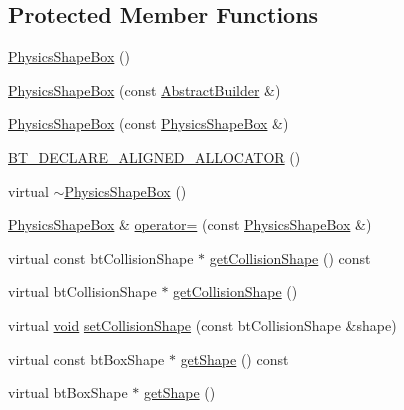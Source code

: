 \subsection*{Protected Member Functions}
\begin{DoxyCompactItemize}
\item 
\mbox{\hyperlink{classnjli_1_1_physics_shape_box_a42baebdb0053634644acf4df9ca2562c}{Physics\+Shape\+Box}} ()
\item 
\mbox{\hyperlink{classnjli_1_1_physics_shape_box_ae80dda3b86c951c04dfb339621159843}{Physics\+Shape\+Box}} (const \mbox{\hyperlink{classnjli_1_1_abstract_builder}{Abstract\+Builder}} \&)
\item 
\mbox{\hyperlink{classnjli_1_1_physics_shape_box_a9e8d8253b125c22fdaa2bc56b48bdf56}{Physics\+Shape\+Box}} (const \mbox{\hyperlink{classnjli_1_1_physics_shape_box}{Physics\+Shape\+Box}} \&)
\item 
\mbox{\hyperlink{classnjli_1_1_physics_shape_box_a2c6aac0c51045c17a0d364fb9fdb151e}{B\+T\+\_\+\+D\+E\+C\+L\+A\+R\+E\+\_\+\+A\+L\+I\+G\+N\+E\+D\+\_\+\+A\+L\+L\+O\+C\+A\+T\+OR}} ()
\item 
virtual \mbox{\hyperlink{classnjli_1_1_physics_shape_box_a3f77f0341fdd6706a182ce94915e0ecc}{$\sim$\+Physics\+Shape\+Box}} ()
\item 
\mbox{\hyperlink{classnjli_1_1_physics_shape_box}{Physics\+Shape\+Box}} \& \mbox{\hyperlink{classnjli_1_1_physics_shape_box_a3096f9c7ee5fe5a0b15672d16bd330e7}{operator=}} (const \mbox{\hyperlink{classnjli_1_1_physics_shape_box}{Physics\+Shape\+Box}} \&)
\item 
virtual const bt\+Collision\+Shape $\ast$ \mbox{\hyperlink{classnjli_1_1_physics_shape_box_a5b2c32f5353b66f77a44fa53fde65d60}{get\+Collision\+Shape}} () const
\item 
virtual bt\+Collision\+Shape $\ast$ \mbox{\hyperlink{classnjli_1_1_physics_shape_box_a3d4319affdfb39571fa631ae31317b57}{get\+Collision\+Shape}} ()
\item 
virtual \mbox{\hyperlink{_thread_8h_af1e856da2e658414cb2456cb6f7ebc66}{void}} \mbox{\hyperlink{classnjli_1_1_physics_shape_box_afef84525d2cb60ad5f2386a4faf4db9a}{set\+Collision\+Shape}} (const bt\+Collision\+Shape \&shape)
\item 
virtual const bt\+Box\+Shape $\ast$ \mbox{\hyperlink{classnjli_1_1_physics_shape_box_a23520ac102041f17c8edf396d82020d6}{get\+Shape}} () const
\item 
virtual bt\+Box\+Shape $\ast$ \mbox{\hyperlink{classnjli_1_1_physics_shape_box_a9b3a640de88bca9d4aec57a5b04c69b1}{get\+Shape}} ()
\end{DoxyCompactItemize}
